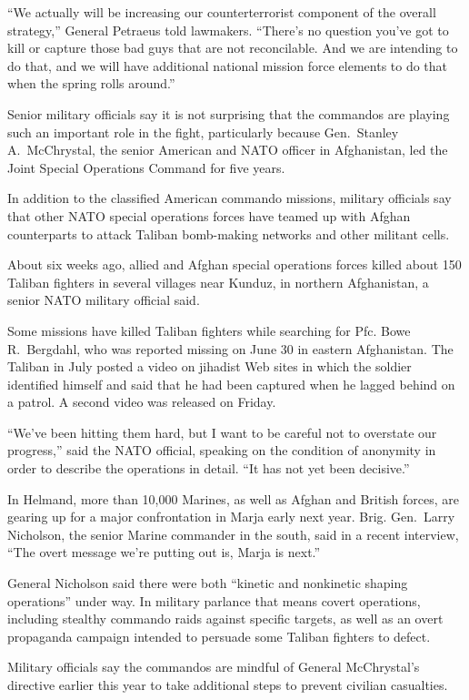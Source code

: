 ﻿\documentclass[12pt]{article}
\begin{document}
``We actually will be increasing our counterterrorist component of the overall strategy,'' General
Petraeus told lawmakers. ``There's no question you've got to kill or capture those bad guys that are
not reconcilable. And we are intending to do that, and we will have additional national mission
force elements to do that when the spring rolls around.''

Senior military officials say it is not surprising that the commandos are playing such an important
role in the fight, particularly because Gen.~Stanley A.~McChrystal, the senior American and NATO
officer in Afghanistan, led the Joint Special Operations Command for five years.

In addition to the classified American commando missions, military officials say that other NATO
special operations forces have teamed up with Afghan counterparts to attack Taliban bomb-making
networks and other militant cells.

About six weeks ago, allied and Afghan special operations forces killed about 150 Taliban fighters
in several villages near Kunduz, in northern Afghanistan, a senior NATO military official said.

Some missions have killed Taliban fighters while searching for Pfc. Bowe R.~Bergdahl, who was
reported missing on June 30 in eastern Afghanistan. The Taliban in July posted a video on jihadist
Web sites in which the soldier identified himself and said that he had been captured when he lagged
behind on a patrol. A second video was released on Friday.

``We've been hitting them hard, but I want to be careful not to overstate our progress,'' said the
NATO official, speaking on the condition of anonymity in order to describe the operations in detail.
``It has not yet been decisive.''

In Helmand, more than 10,000 Marines, as well as Afghan and British forces, are gearing up for a
major confrontation in Marja early next year. Brig. Gen.~Larry Nicholson, the senior Marine
commander in the south, said in a recent interview, ``The overt message we're putting out is, Marja
is next.''

General Nicholson said there were both ``kinetic and nonkinetic shaping operations'' under way. In
military parlance that means covert operations, including stealthy commando raids against specific
targets, as well as an overt propaganda campaign intended to persuade some Taliban fighters to
defect.

Military officials say the commandos are mindful of General McChrystal's directive earlier this year
to take additional steps to prevent civilian casualties.
\end{document}
